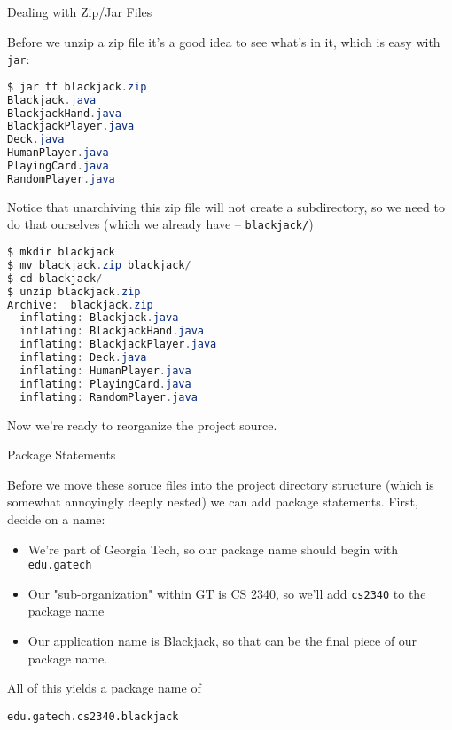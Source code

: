 \documentclass{beamer}
\begin{document}
\begin{frame}[fragile]{Dealing with Zip/Jar Files}

Before we unzip a zip file it's a good idea to see what's in it, which is easy with {\tt jar}:
\begin{lstlisting}[language=Java]
$ jar tf blackjack.zip
Blackjack.java
BlackjackHand.java
BlackjackPlayer.java
Deck.java
HumanPlayer.java
PlayingCard.java
RandomPlayer.java
\end{lstlisting}
Notice that unarchiving this zip file will not create a subdirectory, so we need to do that ourselves (which we already have -- {\tt blackjack/})

\begin{lstlisting}[language=Java]
$ mkdir blackjack
$ mv blackjack.zip blackjack/
$ cd blackjack/
$ unzip blackjack.zip
Archive:  blackjack.zip
  inflating: Blackjack.java
  inflating: BlackjackHand.java
  inflating: BlackjackPlayer.java
  inflating: Deck.java
  inflating: HumanPlayer.java
  inflating: PlayingCard.java
  inflating: RandomPlayer.java
\end{lstlisting}

Now we're ready to reorganize the project source.

\end{frame}

\begin{frame}[fragile]{Package Statements}

Before we move these soruce files into the project directory structure (which is somewhat annoyingly deeply nested) we can add package statements.  First, decide on a name:

\begin{itemize}
\item We're part of Georgia Tech, so our package name should begin with {\tt edu.gatech}
\item Our "sub-organization" within GT is CS 2340, so we'll add {\tt cs2340} to the package name
\item Our application name is Blackjack, so that can be the final piece of our package name.
\end{itemize}

All of this yields a package name of\\
\vspace{.1in}
\begin{center}
{\tt edu.gatech.cs2340.blackjack}
\end{center}

\end{frame}
\end{document}
